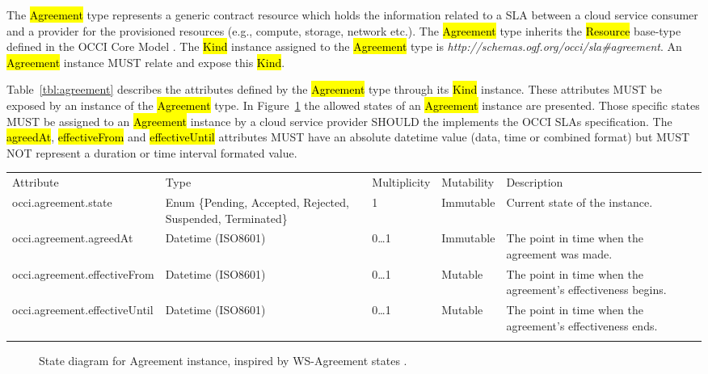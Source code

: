\documentclass[10pt,a4paper]{article}
\begin{document}
The \hl{Agreement} type represents a generic contract resource which holds the information related to a SLA between a cloud service consumer and a provider for the provisioned resources (e.g., compute, storage, network etc.). The \hl{Agreement} type inherits the \hl{Resource} base-type defined in the OCCI Core Model \cite{occi:core}. The \hl{Kind} instance assigned to the \hl{Agreement} type is \textit{http://schemas.ogf.org/occi/sla\#agreement}. An \hl{Agreement} instance MUST relate and expose this \hl{Kind}.

Table~\ref{tbl:agreement} describes the attributes defined by the \hl{Agreement} type through its \hl{Kind} instance. These attributes MUST be exposed by an instance of the \hl{Agreement} type. In Figure~\ref{fig:agreement-states} the allowed states of an \hl{Agreement} instance are presented. Those specific states MUST be assigned to an \hl{Agreement} instance by a cloud service provider SHOULD the implements the OCCI SLAs specification. The \hl{agreedAt}, \hl{effectiveFrom} and \hl{effectiveUntil} attributes MUST have an absolute datetime value (data, time or combined format) but MUST NOT represent a duration or time interval formated value.



{
	\begin{tabular}{lp{2.5cm}p{1cm}lp{6cm}}
	\toprule
	Attribute&Type&Multi\-plicity&Mutability&Description\\
	\colrule
	occi.agreement.state & Enum \{Pending, Accepted, Rejected, Suspended, Terminated\} & 1 & Immutable & Current state of the instance.\\
	occi.agreement.agreedAt & Datetime (ISO8601) & 0\ldots1 & Immutable & The point in time when the agreement was made. \\
	occi.agreement.effectiveFrom & Datetime (ISO8601) & 0\ldots1 & Mutable & The point in time when the agreement’s effectiveness begins. \\
	occi.agreement.effectiveUntil & Datetime (ISO8601) & 0\ldots1 & Mutable & The point in time when the agreement’s effectiveness ends. \\
	\botrule
	\end{tabular}
}


\begin{figure}[!h]
	{\centering {} \par}
	\caption{State diagram for Agreement instance, inspired by WS-Agreement states \cite{ws-agreeement:2007} .}
	\label{fig:agreement-states}
\end{figure}
\end{document}
